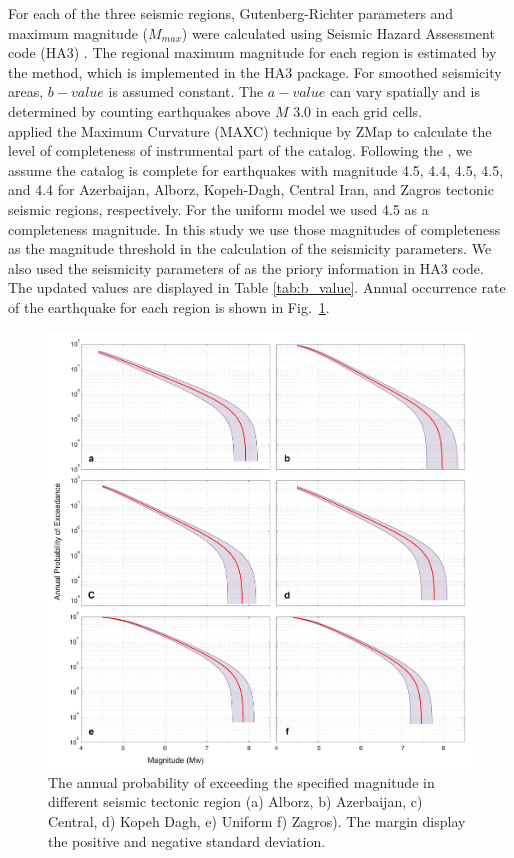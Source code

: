 For each of the three seismic regions, Gutenberg-Richter parameters and maximum magnitude ($M_{max}$) were calculated using Seismic Hazard Assessment code (HA3) \citep{kijko2004}. The regional maximum magnitude for each region is estimated by the \citet{Kijko1989} method, which is implemented in the HA3 package. For smoothed seismicity areas, $b-value$ is assumed constant. The $a-value$ can vary spatially and is determined by counting earthquakes above $M$ 3.0 in each grid cells.\\
\noindent
\citet{Karimiparidari2013} applied the Maximum Curvature (MAXC) technique \citep{Wyss1999, Wiemer2000} by ZMap \citep{Wiemer2001} to calculate the level of completeness of instrumental part of the catalog.  Following the \citet{Karimiparidari2013}, we assume the catalog is complete for earthquakes with magnitude 4.5, 4.4, 4.5, 4.5, and 4.4 for Azerbaijan, Alborz,  Kopeh-Dagh, Central Iran, and Zagros tectonic seismic regions, respectively. For the uniform model we used 4.5 as a completeness magnitude. In this study we use those magnitudes of completeness as the magnitude threshold in the calculation of the seismicity parameters. We also used the seismicity parameters of \citet{Karimiparidari2013} as the priory information in HA3 code. The updated values are displayed in Table \ref{tab:b_value}.  Annual occurrence rate of the earthquake for each region is shown in Fig.~\ref{fig:annual_m}.

\begin{figure} [!ht]
\centering
\includegraphics[scale=0.3]{figures/pdf/figure-04} 
\caption{The annual probability of exceeding the specified magnitude in different seismic tectonic region (a) Alborz, b) Azerbaijan, c) Central, d) Kopeh Dagh, e) Uniform f) Zagros). The margin display the positive and negative standard deviation.}
\label{fig:annual_m}
\end{figure}


